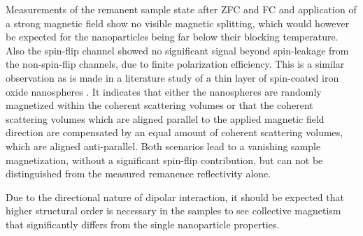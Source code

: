 \documentclass[\main/dresen_thesis.tex]{subfiles}
\begin{document}
  Measurements of the remanent sample state after ZFC and FC and application of a strong magnetic field show no visible magnetic splitting, which would however be expected for the nanoparticles being far below their blocking temperature.
  Also the spin-flip channel showed no significant signal beyond spin-leakage from the non-spin-flip channels, due to finite polarization efficiency.
  This is a similar observation as is made in a literature study of a thin layer of spin-coated iron oxide nanospheres \cite{Mishra_2015_Polar}.
  It indicates that either the nanospheres are randomly magnetized within the coherent scattering volumes or that the coherent scattering volumes which are aligned parallel to the applied magnetic field direction are compensated by an equal amount of coherent scattering volumes, which are aligned anti-parallel.
  Both scenarios lead to a vanishing sample magnetization, without a significant spin-flip contribution, but can not be distinguished from the measured remanence reflectivity alone.

  Due to the directional nature of dipolar interaction, it should be expected that higher structural order is necessary in the samples to see collective magnetism that significantly differs from the single nanoparticle properties.
\end{document}
